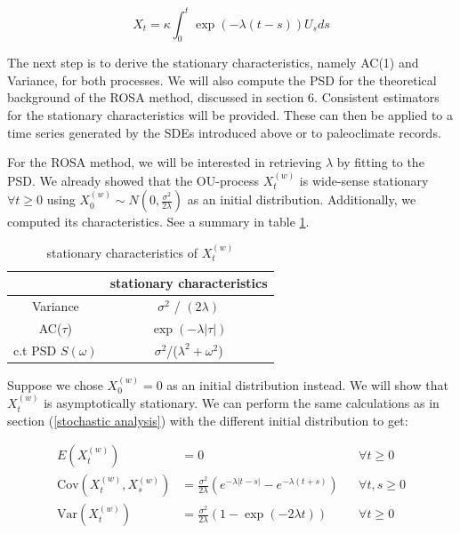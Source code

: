 \documentclass[%
thesis=student,%
coverpage=false,%
titlepage=false,%
headmarks=true, %
english,%
font=libertine, %
math=newpxtx, %
BCOR=5mm,%
coverBCOR=11mm%
]{tumbook}
\begin{document}
\begin{equation}
    X_{t} = \kappa\int_{0}^{t}\exp(-\lambda(t-s))U_{s}ds
    \label{red noise solution}
\end{equation}

The next step is to derive the stationary characteristics, namely AC(1) and Variance, for both processes. We will also compute the PSD for the theoretical background of the ROSA method, discussed in section 6. Consistent estimators for the stationary characteristics will be provided. These can then be applied to a time series generated by the SDEs introduced above or to paleoclimate records. 

For the ROSA method, we will be interested in retrieving $\lambda$ by fitting to the PSD. We already showed that the OU-process $X_{t}^{(w)}$ is wide-sense stationary $\forall t \geq 0$ using $X_{0}^{(w)} \sim N(0,\frac{\sigma^2}{2\lambda})$ as an initial distribution. Additionally, we computed its characteristics. See a summary in table \ref{tab:white_noise_stat_char}. 


\begin{table}[t]
\centering
\begin{tabular}{|c|c|}
\hline
& stationary characteristics\\
\hline
Variance & $\sigma^2$ / $(2\lambda)$\\
AC($\tau$) & $\exp(-\lambda |\tau|)$\\
c.t PSD $S(\omega)$ & $\sigma^2$/($\lambda^2 + \omega^2$)\\
\hline
\end{tabular}
\caption{stationary characteristics of $X_{t}^{(w)}$}
\label{tab:white_noise_stat_char}
\end{table}

Suppose we chose $X_{0}^{(w)} = 0$ as an initial distribution instead. We will show that $X_{t}^{(w)}$ is asymptotically stationary. We can perform the same calculations as in section (\ref{stochastic analysis}) with the different initial distribution to get:

 \begin{align*}
    E(X_{t}^{(w)}) &= 0   && \forall t \geq 0 \\
    \text{Cov}(X_{t}^{(w)},X_{s}^{(w)}) &= \frac{\sigma ^2}{2\lambda}(e^{-\lambda\lvert t-s \rvert}-e^{-\lambda(t+s)}) && \forall t, s \geq 0 \\
    \text{Var}(X_{t}^{(w)}) &= \frac{\sigma^2}{2\lambda}(1-\exp(-2\lambda t)) && \forall t \geq 0 
\end{align*}
\end{document}
